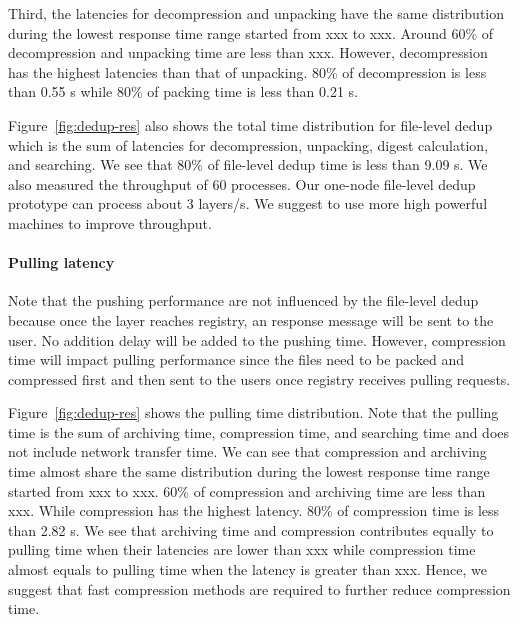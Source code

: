 Third, the latencies for decompression and unpacking have the same distribution during the lowest response time range started from xxx to xxx. Around 60\% of decompression and unpacking time are less than xxx. However, decompression has the highest latencies than that of unpacking. 80\% of decompression is less than 0.55 s while 80\% of packing time is less than 0.21 s. 

Figure~\ref{fig:dedup-res} also shows the total time distribution for file-level dedup which is the sum of latencies for decompression, unpacking, digest calculation, and searching. We see that 80\% of file-level dedup time is less than 9.09 s. We also measured the throughput of 60 processes. Our one-node file-level dedup prototype can process about 3 layers/s. We suggest to use more high powerful machines to improve throughput.

\paragraph{Pulling latency}
Note that the pushing performance are not influenced by the file-level dedup because once the layer reaches registry, an response message will be sent to the user. No addition delay will be added to the pushing time. However, compression time will impact pulling performance since the files need to be packed and compressed first and then sent to the users once registry receives pulling requests. 

Figure~\ref{fig:dedup-res} shows the pulling time distribution. Note that the pulling time is the sum of archiving time, compression time, and searching time and does not include network transfer time. We can see that 
compression and archiving time almost share the same distribution during the lowest response time range started from xxx to xxx. 60\% of compression and archiving time are less than xxx. While compression has the highest latency. 80\% of compression time is less than 2.82 s. We see that archiving time and compression contributes equally to pulling time when their latencies are lower than xxx while compression time almost equals to pulling time when the latency is greater than xxx. Hence, we suggest that fast compression methods are required to further reduce compression time.  
 

